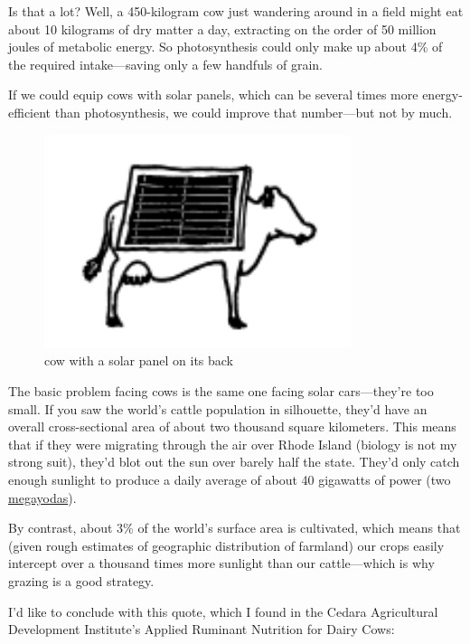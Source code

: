 {Is that a lot? Well, a 450-kilogram cow just wandering around in a field might eat about 10 kilograms of dry matter a day, extracting on the order of 50 million joules of metabolic energy. So photosynthesis could only make up about 4\% of the required intake—saving only a few handfuls of grain.}

{If we could equip cows with solar panels, which can be several times more energy-efficient than photosynthesis, we could improve that number—but not by much.}

\begin{figure}[!htbp]
\centering
\includegraphics[scale=0.5, max width=0.8\textwidth]{imgs/a/17/03.png}
\caption{cow with a solar panel on its back}
\end{figure}

{The basic problem facing cows is the same one facing solar cars—they're too small. If you saw the world's cattle population in silhouette, they'd have an overall cross-sectional area of about two thousand square kilometers. This means that if they were migrating through the air over Rhode Island (biology is not my strong suit), they'd blot out the sun over barely half the state. They'd only catch enough sunlight to produce a daily average of about 40 gigawatts of power (two \href{http://what-if.xkcd.com/3/}{megayodas}).}

{By contrast, about 3\% of the world's surface area is cultivated, which means that (given rough estimates of geographic distribution of farmland) our crops easily intercept over a thousand times more sunlight than our cattle—which is why grazing is a good strategy.}

{I'd like to conclude with this quote, which I found in the Cedara Agricultural Development Institute's Applied Ruminant Nutrition for Dairy Cows:}


